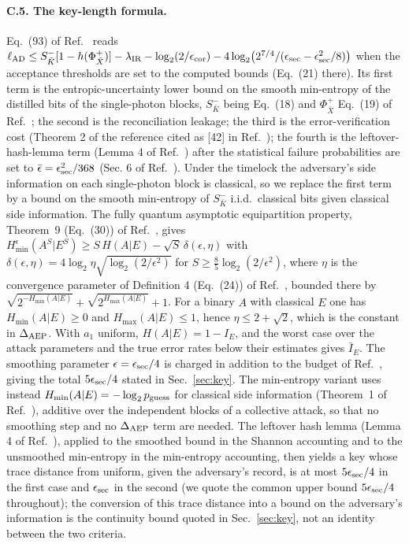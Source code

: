 \documentclass[aps,pra,twocolumn,superscriptaddress,nofootinbib]{revtex4-2}
\begin{document}
\paragraph*{C.5. The key-length formula.} Eq.~(93) of Ref.~\cite{T25} reads $\ell_{\rm AD}\le S^-_{\bar K}[1-h(\Phi^+_{\bar X})]-\lambda_{\rm IR}-\log_2(2/\epsilon_{\rm cor})-4\log_2\!\big(2^{7/4}/(\epsilon_{\rm sec}-\epsilon_{\rm sec}^2/8)\big)$ when the acceptance thresholds are set to the computed bounds (Eq.~(21) there). Its first term is the entropic-uncertainty lower bound on the smooth min-entropy of the distilled bits of the single-photon blocks, $S^-_{\bar K}$ being Eq.~(18) and $\Phi^+_{\bar X}$ Eq.~(19) of Ref.~\cite{T25}; the second is the reconciliation leakage; the third is the error-verification cost (Theorem 2 of the reference cited as [42] in Ref.~\cite{T25}); the fourth is the leftover-hash-lemma term (Lemma 4 of Ref.~\cite{T25}) after the statistical failure probabilities are set to $\bar\epsilon=\epsilon_{\rm sec}^2/368$ (Sec. 6 of Ref.~\cite{T25}). Under the timelock the adversary's side information on each single-photon block is classical, so we replace the first term by a bound on the smooth min-entropy of $S^-_{\bar K}$ i.i.d.\ classical bits given classical side information. The fully quantum asymptotic equipartition property, Theorem~9 (Eq.~(30)) of Ref.~\cite{TCR09}, gives $H^\epsilon_{\min}(A^S|E^S)\ge S\,H(A|E)-\sqrt S\,\delta(\epsilon,\eta)$ with $\delta(\epsilon,\eta)=4\log_2\eta\sqrt{\log_2(2/\epsilon^2)}$ for $S\ge\tfrac85\log_2(2/\epsilon^2)$, where $\eta$ is the convergence parameter of Definition 4 (Eq.~(24)) of Ref.~\cite{TCR09}, bounded there by $\sqrt{2^{-H_{\min}(A|E)}}+\sqrt{2^{H_{\max}(A|E)}}+1$. For a binary $A$ with classical $E$ one has $H_{\min}(A|E)\ge0$ and $H_{\max}(A|E)\le1$, hence $\eta\le2+\sqrt2$, which is the constant in $\Delta_{\rm AEP}$. With $a_1$ uniform, $H(A|E)=1-I_E$, and the worst case over the attack parameters and the true error rates below their estimates gives $\bar I_E$. The smoothing parameter $\epsilon=\epsilon_{\rm sec}/4$ is charged in addition to the budget of Ref.~\cite{T25}, giving the total $5\epsilon_{\rm sec}/4$ stated in Sec.~\ref{sec:key}. The min-entropy variant uses instead $H_{\min}(A|E)=-\log_2p_{\rm guess}$ for classical side information (Theorem~1 of Ref.~\cite{KRS09}), additive over the independent blocks of a collective attack, so that no smoothing step and no $\Delta_{\rm AEP}$ term are needed. The leftover hash lemma (Lemma 4 of Ref.~\cite{T25}), applied to the smoothed bound in the Shannon accounting and to the unsmoothed min-entropy in the min-entropy accounting, then yields a key whose trace distance from uniform, given the adversary's record, is at most $5\epsilon_{\rm sec}/4$ in the first case and $\epsilon_{\rm sec}$ in the second (we quote the common upper bound $5\epsilon_{\rm sec}/4$ throughout); the conversion of this trace distance into a bound on the adversary's information is the continuity bound quoted in Sec.~\ref{sec:key}, not an identity between the two criteria.
\end{document}
